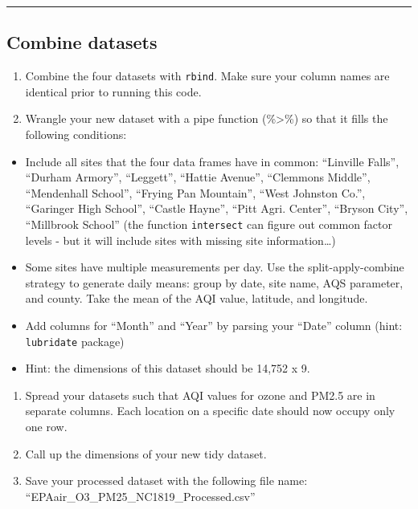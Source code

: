 \documentclass[
]{article}
\begin{document}
\begin{center}\rule{0.5\linewidth}{0.5pt}\end{center}

\hypertarget{combine-datasets-1}{%
\subsection{Combine datasets}\label{combine-datasets-1}}

\begin{enumerate}
\def\labelenumi{\arabic{enumi}.}
\setcounter{enumi}{6}
\item
  Combine the four datasets with \texttt{rbind}. Make sure your column
  names are identical prior to running this code.
\item
  Wrangle your new dataset with a pipe function (\%\textgreater\%) so
  that it fills the following conditions:
\end{enumerate}

\begin{itemize}
\item
  Include all sites that the four data frames have in common: ``Linville
  Falls'', ``Durham Armory'', ``Leggett'', ``Hattie Avenue'', ``Clemmons
  Middle'', ``Mendenhall School'', ``Frying Pan Mountain'', ``West
  Johnston Co.'', ``Garinger High School'', ``Castle Hayne'', ``Pitt
  Agri. Center'', ``Bryson City'', ``Millbrook School'' (the function
  \texttt{intersect} can figure out common factor levels - but it will
  include sites with missing site information\ldots)
\item
  Some sites have multiple measurements per day. Use the
  split-apply-combine strategy to generate daily means: group by date,
  site name, AQS parameter, and county. Take the mean of the AQI value,
  latitude, and longitude.
\item
  Add columns for ``Month'' and ``Year'' by parsing your ``Date'' column
  (hint: \texttt{lubridate} package)
\item
  Hint: the dimensions of this dataset should be 14,752 x 9.
\end{itemize}

\begin{enumerate}
\def\labelenumi{\arabic{enumi}.}
\setcounter{enumi}{8}
\item
  Spread your datasets such that AQI values for ozone and PM2.5 are in
  separate columns. Each location on a specific date should now occupy
  only one row.
\item
  Call up the dimensions of your new tidy dataset.
\item
  Save your processed dataset with the following file name:
  ``EPAair\_O3\_PM25\_NC1819\_Processed.csv''
\end{enumerate}
\end{document}
